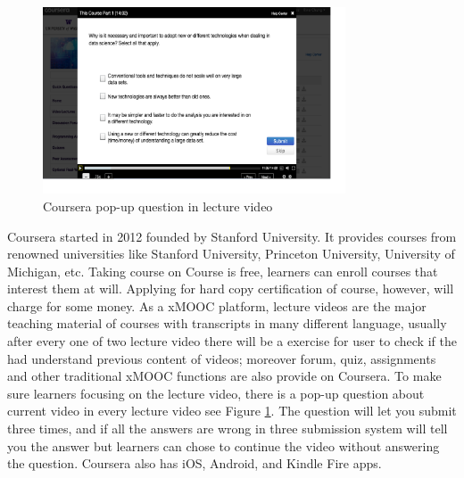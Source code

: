 \begin{figure}[H]
    \centering
    \includegraphics[width = 0.8\textwidth]{fig/coursera_pop.eps}
    \caption{Coursera pop-up question in lecture video}
    \label{fig:coursera_pop}
\end{figure}

Coursera \cite{coursera} started in 2012 founded by Stanford University. It provides courses from renowned universities like Stanford University,  Princeton University, University of Michigan, etc.
Taking course on Course is free, learners can enroll courses that interest them at will.
Applying for hard copy certification of course, however, will charge for some money.
As a xMOOC platform, lecture videos are the major teaching material of courses with transcripts in many different language, usually after every one of two lecture video there will be a exercise for user to check if the had understand previous content of videos; moreover forum, quiz, assignments and other traditional xMOOC functions are also provide on Coursera.
To make sure learners focusing on the lecture video, there is a pop-up question about current video in every lecture video see Figure \ref{fig:coursera_pop}.
The question will let you submit three times, and if all the answers are wrong in three submission system will tell you the answer but learners can chose to continue the video without answering the question.
Coursera also has iOS, Android, and Kindle Fire apps.

